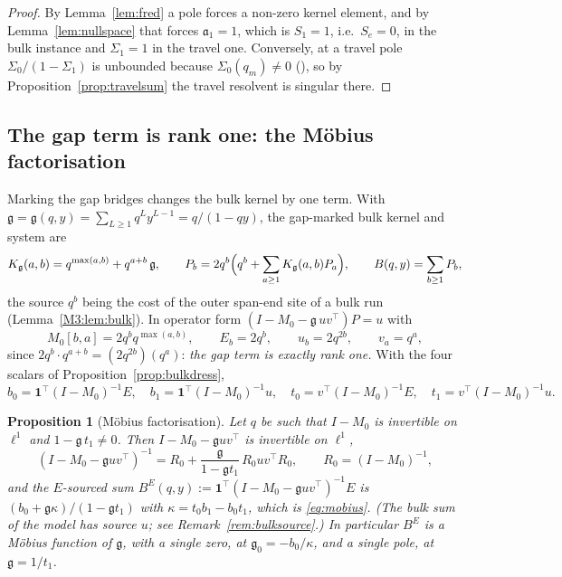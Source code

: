\documentclass[11pt]{article}
\theoremstyle{plain}
\newtheorem{proposition}[theorem]{Proposition}
\theoremstyle{definition}
\theoremstyle{remark}
\begin{document}
\begin{proof}
By Lemma~\ref{lem:fred} a pole forces a non-zero kernel element, and by Lemma~\ref{lem:nullspace}
that forces $\mathfrak a_1=1$, which is $S_1=1$, i.e.\ $S_e=0$, in the bulk instance and
$\Sigma_1=1$ in the travel one. Conversely, at a travel pole $\Sigma_0/(1-\Sigma_1)$ is unbounded
because $\Sigma_0(q_m)\ne0$ ({\cite[Proposition ``the numerators do not vanish at the travel poles'', \textup{prop:numnonvanish}]{Bonfioli2026bA}}), so by
Proposition~\ref{prop:travelsum} the travel resolvent is singular there.
\end{proof}

\subsection{The gap term is rank one: the M\"obius factorisation}\label{sec:mob}

Marking the gap bridges changes the bulk kernel by one term. With
$\mathfrak g=\mathfrak g(q,y)=\sum_{L\ge1}q^Ly^{L-1}=q/(1-qy)$, the gap-marked bulk kernel and
system are
\begin{equation}\label{eq:gapkernel}
   K_{\mathfrak g}(a,b)=q^{\max(a,b)}+q^{a+b}\,\mathfrak g,\qquad
   P_b=2q^b\Bigl(q^b+\sum_{a\ge1}K_{\mathfrak g}(a,b)P_a\Bigr),\qquad B(q,y)=\sum_{b\ge1}P_b ,
\end{equation}
the source $q^b$ being the cost of the outer span-end site of a bulk run (Lemma~\ref{M3:lem:bulk}). In operator form
$(I-M_0-\mathfrak g\,uv^{\!\top})P=u$ with
\begin{equation}\label{eq:rankone}
   M_0[b,a]=2q^bq^{\max(a,b)},\qquad E_b=2q^b,\qquad u_b=2q^{2b},\qquad v_a=q^a ,
\end{equation}
since $2q^b\cdot q^{a+b}=(2q^{2b})(q^a)$: \emph{the gap term is exactly rank one.} With the four
scalars of Proposition~\ref{prop:bulkdress},
\[
  b_0=\mathbf 1^{\!\top}(I-M_0)^{-1}E,\quad b_1=\mathbf 1^{\!\top}(I-M_0)^{-1}u,\quad
  t_0=v^{\!\top}(I-M_0)^{-1}E,\quad t_1=v^{\!\top}(I-M_0)^{-1}u .
\]

\begin{proposition}[M\"obius factorisation]\label{prop:mobius}
Let $q$ be such that $I-M_0$ is invertible on $\ell^1$ and $1-\mathfrak g\,t_1\ne0$. Then
$I-M_0-\mathfrak guv^{\!\top}$ is invertible on $\ell^1$,
\begin{equation}\label{eq:smresolvent}
   (I-M_0-\mathfrak guv^{\!\top})^{-1}
   =R_0+\frac{\mathfrak g}{1-\mathfrak gt_1}\,R_0uv^{\!\top}R_0,\qquad R_0=(I-M_0)^{-1},
\end{equation}
and the $E$-sourced sum $B^E(q,y):=\mathbf 1^{\!\top}(I-M_0-\mathfrak guv^{\!\top})^{-1}E$ is
$(b_0+\mathfrak g\kappa)/(1-\mathfrak g t_1)$ with $\kappa=t_0b_1-b_0t_1$, which is
\eqref{eq:mobius}. \textup{(}The bulk sum of the model has source $u$; see
Remark~\ref{rem:bulksource}.\textup{)} In particular $B^E$ is a M\"obius function of $\mathfrak g$, with a single zero,
at $\mathfrak g_0=-b_0/\kappa$, and a single pole, at $\mathfrak g=1/t_1$.
\end{proposition}
\end{document}
